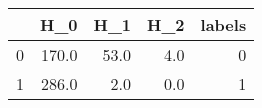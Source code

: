 \begin{tabular}{lrrrr}
\toprule
{} &    H\_0 &   H\_1 &  H\_2 &  labels \\
\midrule
0 &  170.0 &  53.0 &  4.0 &       0 \\
1 &  286.0 &   2.0 &  0.0 &       1 \\
\bottomrule
\end{tabular}
